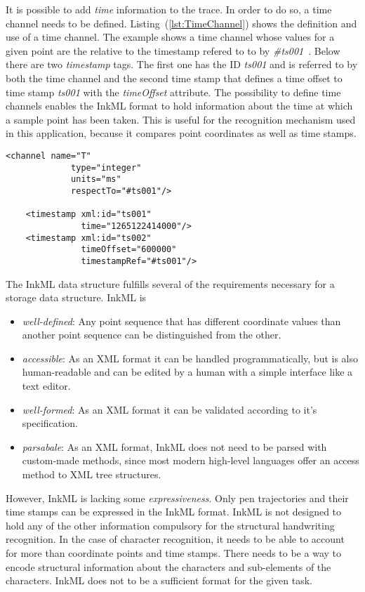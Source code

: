 It is possible to add \emph{time} information to the trace. In order to do so,
a time channel needs to be defined. Listing~(\ref{lst:TimeChannel}) shows the 
definition and use of a time channel. The example shows a time channel whose 
values for a given point are the relative to the timestamp refered to to by 
\emph{\#ts001}~. Below there are two \emph{timestamp} tags.
The first one has the ID \emph{ts001} and is referred to by both the
time channel and the second time stamp that defines a time offset to time stamp
\emph{ts001} with the \emph{timeOffset} attribute.
The possibility to define time channels enables the InkML format to hold 
information about the time at which a sample point has been taken.
This is useful for the recognition mechanism used in this application,
because it compares point coordinates as well as time stamps.
\begin{xmlcode}
  \begin{lstlisting}[emph={timestamp,channel},emphstyle=\textbf,caption={Demonstration of the \emph{time channel}},label=lst:TimeChannel]
    <channel name="T" 
             type="integer"
             units="ms"
             respectTo="#ts001"/>

    <timestamp xml:id="ts001" 
               time="1265122414000"/>
    <timestamp xml:id="ts002" 
               timeOffset="600000" 
               timestampRef="#ts001"/>
  \end{lstlisting}
\end{xmlcode}
The InkML data structure fulfills several of the requirements necessary for a 
storage data structure. InkML is 
\begin{itemize}
  \item \emph{well-defined}: Any point sequence that has different coordinate
        values than another point sequence can be distinguished from the other.
        
  \item \emph{accessible}: As an XML format it can be handled programmatically,
        but is also human-readable and can be edited by a human with a simple
        interface like a text editor.

  \item \emph{well-formed}: As an XML format it can be validated according to 
        it's specification.

  \item \emph{parsabale}: As an XML format, InkML does not need to be parsed with
        custom-made methods, since most modern high-level languages offer
        an access method to XML tree structures.
\end{itemize}
However, InkML is lacking some \emph{expressiveness}. Only pen trajectories and
their time stamps can be expressed in the InkML format. InkML is not designed 
to hold any of the other information compulsory for the structural handwriting
recognition. In the case of character recognition, it needs to be able to 
account for more than coordinate points and time stamps. There needs to be a 
way to encode structural information about the characters and sub-elements of 
the characters. InkML does not to be a sufficient format for the given task.

